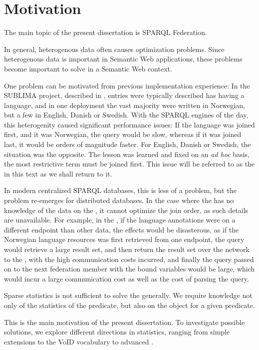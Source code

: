 \section{Motivation}

The main topic of the present dissertation is SPARQL
Federation.

In general, heterogenous data often causes optimization
problems. Since heterogenous data is important in Semantic Web
applications, these problems become important to solve in a Semantic
Web context.

One problem can be motivated from previous implementation experience:
In the SUBLIMA project, described in \cite{sublima}, entries were
typically described has having a language, and in one deployment the
vast majority were written in Norwegian, but a few in English, Danish
or Swedish. With the SPARQL engines of the day, this heterogenity
caused significant performance issues: If the language was joined
first, and it was Norwegian, the query would be slow, whereas if it
was joined last, it would be orders of magnitude faster. For English,
Danish or Swedish, the situation was the opposite. The lesson was
learned and fixed on an \textit{ad hoc} basis, the most restrictive
term must be joined first. This issue will be referred to as the
\langcase{} in this text as we shall return to it.

In modern centralized SPARQL databases, this is less of a problem, but
the problem re-emerges for distributed databases. In the case where
the \fedeng{} has no knowledge of the data on the \indendp, it cannot
optimize the join order, as such details are unavailable. For example,
in the \langcase, if the language annotations were on a different
endpoint than other data, the effects would be disasterous, as if the
Norwegian language resources was first retrieved from one endpoint,
the query would retrieve a large result set, and then return the
result set over the network to the \fedeng, with the high
communication costs incurred, and finally the query passed on to the
next federation member with the bound variables would be large, which
would incur a large communication cost as well as the cost of parsing
the query. 

Sparse statistics is not sufficient to solve the \langcase{}
generally. We require knowledge not only of the statistics of the
predicate, but also on the object for a given predicate.

This is the main motivation of the present dissertation. To investigate
possible solutions, we explore different directions in statistics,
ranging from simple extensions to the VoID vocabulary\cite{void} to
advanced \SRL.
